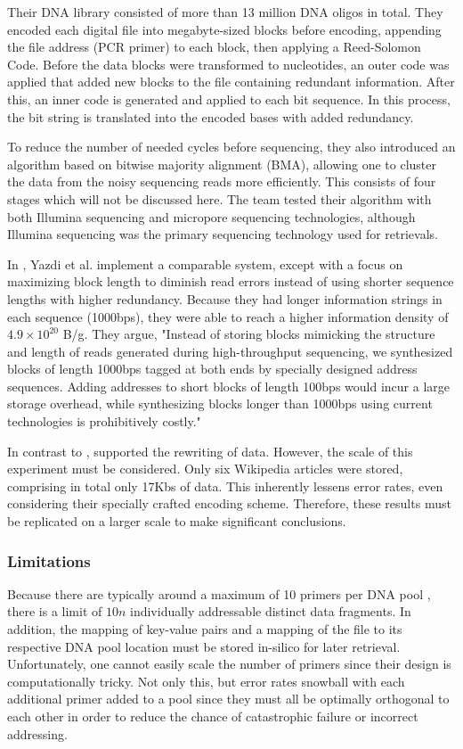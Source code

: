 \documentclass[a4paper,conference]{IEEEtran}
\begin{document}
Their DNA library consisted of more than 13 million DNA oligos in total. They encoded each digital file into megabyte-sized blocks before encoding, appending the file address (PCR primer) to each block, then applying a Reed-Solomon Code. Before the data blocks were transformed to nucleotides, an outer code was applied that added new blocks to the file containing redundant information. After this, an inner code is generated and applied to each bit sequence. In this process, the bit string is translated into the encoded bases with added redundancy. 

To reduce the number of needed cycles before sequencing, they also introduced an algorithm based on bitwise majority alignment (BMA), allowing one to cluster the data from the noisy sequencing reads more efficiently. This consists of four stages which will not be discussed here. The team tested their algorithm with both Illumina sequencing and micropore sequencing technologies, although Illumina sequencing was the primary sequencing technology used for retrievals.

In \cite{pcrbased2}, Yazdi et al. implement a comparable system, except with a focus on maximizing block length to diminish read errors instead of using shorter sequence lengths with higher redundancy. Because they had longer information strings in each sequence (1000bps), they were able to reach a higher information density of $4.9 \times 10^{20}$ B/g. They argue, "Instead of storing blocks mimicking the structure and length of reads generated during high-throughput sequencing, we synthesized blocks of length 1000bps tagged at both ends by specially designed address sequences. Adding addresses to short blocks of length 100bps would incur a large storage overhead, while synthesizing blocks longer than 1000bps using current technologies is prohibitively costly."

In contrast to \cite{pcrbased}, \cite{pcrbased2} supported the rewriting of data. However, the scale of this experiment must be considered. Only six Wikipedia articles were stored, comprising in total only 17Kbs of data. This inherently lessens error rates, even considering their specially crafted encoding scheme. Therefore, these results must be replicated on a larger scale to make significant conclusions. 

\subsubsection{Limitations}
Because there are typically around a maximum of 10 primers per DNA pool \cite{}, there is a limit of $10n$ individually addressable distinct data fragments. In addition, the mapping of key-value pairs and a mapping of the file to its respective DNA pool location must be stored in-silico for later retrieval. Unfortunately, one cannot easily scale the number of primers since their design is computationally tricky. Not only this, but error rates snowball with each additional primer added to a pool since they must all be optimally orthogonal to each other in order to reduce the chance of catastrophic failure or incorrect addressing.
\end{document}

